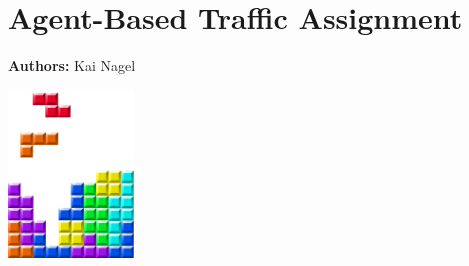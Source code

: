 \chapter{Agent-Based Traffic Assignment }
\label{ch:abta}

\hfill \textbf{Authors:} Kai Nagel

\begin{center} \includegraphics[width=0.25\textwidth, angle=0]{figures/MATSimBook.png} \end{center}



